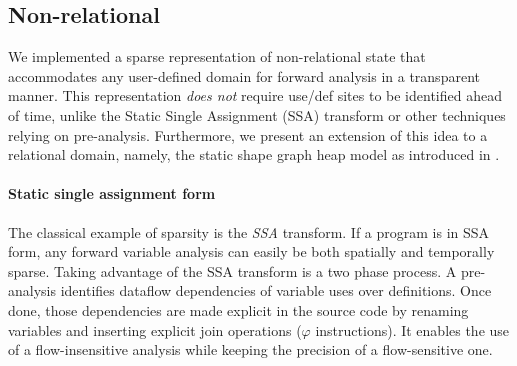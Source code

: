 \documentclass[11pt]{article}
\renewcommand{\phi}{\varphi}
\begin{document}
\subsection*{Non-relational}

We implemented a sparse representation of non-relational state that accommodates any user-defined domain for forward analysis in a transparent manner.
This representation \emph{does not} require use/def sites to be identified ahead of time, unlike the Static Single Assignment (SSA) transform or other techniques relying on pre-analysis\cite{sparse-nr}.
Furthermore, we present an extension of this idea to a relational domain, namely, the static shape graph heap model as introduced in \cite{ssc}.

\paragraph{Static single assignment form} The classical example of sparsity is the \emph{SSA} transform. If a program is in SSA form, any forward variable analysis can easily be both spatially and temporally sparse. Taking advantage of the SSA transform is a two phase process. A pre-analysis identifies dataflow dependencies of variable uses over definitions. Once done, those dependencies are made explicit in the source code by renaming variables and inserting explicit join operations ($\phi$ instructions). It enables the use of a flow-insensitive analysis while keeping the precision of a flow-sensitive one.
\end{document}
